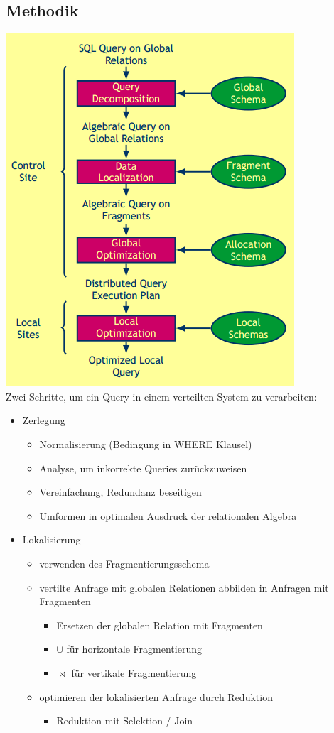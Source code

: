 \documentclass[a4paper,11pt]{article}
\begin{document}
\subsection{Methodik}
\includegraphics[scale=0.7]{src/verteilte_anfrageverarbeitung.png}\\
Zwei Schritte, um ein Query in einem verteilten System zu verarbeiten:
\begin{itemize}
\item Zerlegung
\begin{itemize}
\item Normalisierung (Bedingung in WHERE Klausel)
\item Analyse, um inkorrekte Queries zurückzuweisen
\item Vereinfachung, Redundanz beseitigen
\item Umformen in optimalen Ausdruck der relationalen Algebra
\end{itemize}
\item Lokalisierung
\begin{itemize}
\item verwenden des Fragmentierungsschema
\item vertilte Anfrage mit globalen Relationen abbilden in Anfragen mit Fragmenten
\begin{itemize}
\item Ersetzen der globalen Relation mit Fragmenten
\item $\cup$ für horizontale Fragmentierung
\item $\bowtie$ für vertikale Fragmentierung
\end{itemize}
\item optimieren der lokalisierten Anfrage durch Reduktion
\begin{itemize}
\item Reduktion mit Selektion / Join
\end{itemize}
\end{itemize}
\end{itemize}
\end{document}

